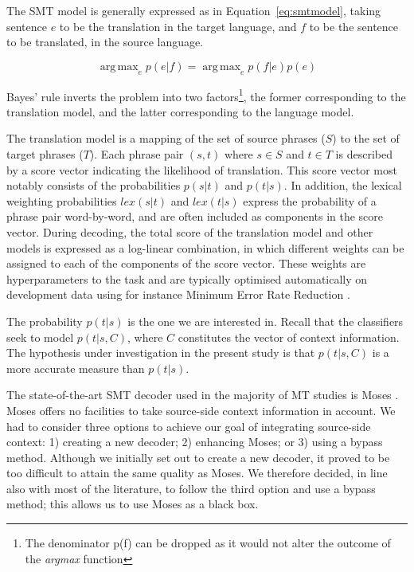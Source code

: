 \documentclass[smallextended]{svjour3}       %
\theoremstyle{break}
\DeclareMathOperator*{\argmax}{arg\,max}
\begin{document}
The SMT model is generally expressed as in Equation~\ref{eq:smtmodel}, taking
sentence $e$ to be the translation in the target language, and $f$ to be the sentence to be
translated, in the source language.

\begin{equation}
\argmax_e p(e|f) = \argmax_e p(f|e)p(e)
\label{eq:smtmodel}
\end{equation}

Bayes' rule inverts the problem into two factors\footnote{The denominator p(f)
can be dropped as it would not alter the outcome of the \emph{argmax}
function}, the former corresponding to the translation model, and the latter
corresponding to the language model. 

The translation model is a mapping of the set of source phrases ($S$) to the
set of target phrases ($T$). Each phrase pair $(s,t)$ where $s \in S$ and $t
\in T$ is described by a score vector indicating the likelihood of
translation. This score vector most notably consists of the probabilities
$p(s|t)$ and $p(t|s)$. In addition, the lexical weighting probabilities $lex(s|t)$
and $lex(t|s)$ express the probability of a phrase pair word-by-word, and are
often included as components in the score vector. During decoding, the total
score of the translation model and other models is expressed as a log-linear
combination, in which different weights can be assigned to each of the
components of the score vector. These weights are hyperparameters to the task and
are typically optimised automatically on development data using for instance
Minimum Error Rate Reduction \citep{MERT}.

The probability $p(t|s)$ is the one we are interested in. Recall that the
classifiers seek to model $p(t|s,C)$, where $C$ constitutes the vector of
context information. The hypothesis under investigation in the present study is
that $p(t|s,C)$ is a more accurate measure than $p(t|s)$.

The state-of-the-art SMT decoder used in the majority of MT studies is Moses
\citep{MOSES}. Moses offers no facilities to take source-side context
information in account. We had to consider three options to achieve our goal of
integrating source-side context: 1) creating a new decoder; 2) enhancing
Moses; or 3) using a bypass method. Although we initially set out to create a
new decoder, it proved to be too difficult to attain the same quality as Moses.
We therefore decided, in line also with most of the literature, to follow the
third option and use a bypass method; this allows us to use Moses as a black box.
\end{document}
